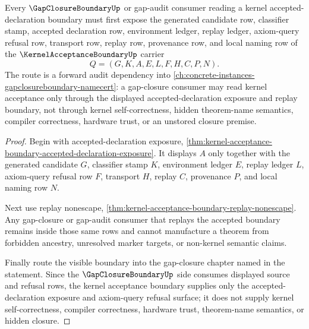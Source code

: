 \begin{theorem}
\label{thm:kernel-acceptance-boundary-gap-closure-forward-route}
Every $\GapClosureBoundaryUp$ or gap-audit consumer reading a kernel accepted-declaration boundary must first expose the generated candidate row, classifier stamp, accepted declaration row, environment ledger, replay ledger, axiom-query refusal row, transport row, replay row, provenance row, and local naming row of the $\KernelAcceptanceBoundaryUp$ carrier
$$
Q=(G,K,A,E,L,F,H,C,P,N).
$$
The route is a forward audit dependency into \autoref{ch:concrete-instances-gapclosureboundary-namecert}: a gap-closure consumer may read kernel acceptance only through the displayed accepted-declaration exposure and replay boundary, not through kernel self-correctness, hidden theorem-name semantics, compiler correctness, hardware trust, or an unstored closure premise.
\end{theorem}
\begin{proof}
Begin with accepted-declaration exposure, \autoref{thm:kernel-acceptance-boundary-accepted-declaration-exposure}. It displays $A$ only together with the generated candidate $G$, classifier stamp $K$, environment ledger $E$, replay ledger $L$, axiom-query refusal row $F$, transport $H$, replay $C$, provenance $P$, and local naming row $N$.

Next use replay nonescape, \autoref{thm:kernel-acceptance-boundary-replay-nonescape}. Any gap-closure or gap-audit consumer that replays the accepted boundary remains inside those same rows and cannot manufacture a theorem from forbidden ancestry, unresolved marker targets, or non-kernel semantic claims.

Finally route the visible boundary into the gap-closure chapter named in the statement. Since the $\GapClosureBoundaryUp$ side consumes displayed source and refusal rows, the kernel acceptance boundary supplies only the accepted-declaration exposure and axiom-query refusal surface; it does not supply kernel self-correctness, compiler correctness, hardware trust, theorem-name semantics, or hidden closure.
\end{proof}

